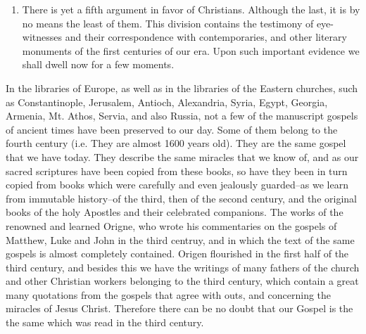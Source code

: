 \begin{enumerate}
    \item There is yet a fifth argument in favor of Christians. Although the last, it is by no means the least of them. This division contains the testimony of eye-witnesses and their correspondence with contemporaries, and other literary monuments of the first centuries of our era. Upon such important evidence we shall dwell now for a few moments.
\end{enumerate}

In the libraries of Europe, as well as in the libraries of the Eastern churches, such as Constantinople, Jerusalem, Antioch, Alexandria, Syria, Egypt, Georgia, Armenia, Mt. Athos, Servia, and also Russia, not a few of the manuscript gospels of ancient times have been preserved to our day. Some of them belong to the fourth century (i.e. They are almost 1600 years old). They are the same gospel that we have today. They describe the same miracles that we know of, and as our sacred scriptures have been copied from these books, so have they been in turn copied from books which were carefully and even jealously guarded--as we learn from immutable history--of the third, then of the second century, and the original books of the holy Apostles and their celebrated companions. The works of the renowned and learned Origne, who wrote his commentaries on the gospels of Matthew, Luke and John in the third centruy, and in which the text of the same gospels is almost completely contained. Origen flourished in the first half of the third century, and besides this we have the writings of many fathers of the church and other Christian workers belonging to the third century, which contain a great many quotations from the gospels that agree with outs, and concerning the miracles of Jesus Christ. Therefore there can be no doubt that our Gospel is the the same which was read in the third century.

